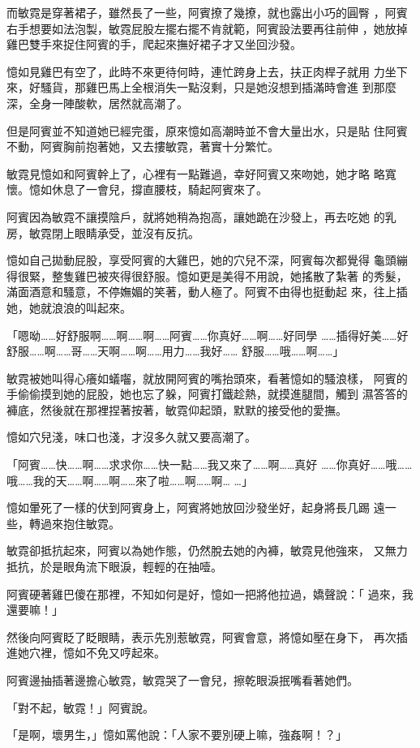 而敏霓是穿著裙子，雖然長了一些，阿賓撩了幾撩，就也露出小巧的圓臀
，阿賓右手想要如法泡製，敏霓屁股左擺右擺不肯就範，阿賓設法要再往前伸
，她放掉雞巴雙手來捉住阿賓的手，爬起來撫好裙子才又坐回沙發。

憶如見雞巴有空了，此時不來更待何時，連忙跨身上去，扶正肉桿子就用
力坐下來，好騷貨，那雞巴馬上全根消失一點沒剩，只是她沒想到插滿時會進
到那麼深，全身一陣酸軟，居然就高潮了。

但是阿賓並不知道她已經完蛋，原來憶如高潮時並不會大量出水，只是貼
住阿賓不動，阿賓胸前抱著她，又去摟敏霓，著實十分繁忙。

敏霓見憶如和阿賓幹上了，心裡有一點難過，幸好阿賓又來吻她，她才略
略寬懷。憶如休息了一會兒，撐直腰枝，騎起阿賓來了。

阿賓因為敏霓不讓摸陰戶，就將她稍為抱高，讓她跪在沙發上，再去吃她
的乳房，敏霓閉上眼睛承受，並沒有反抗。

憶如自己拋動屁股，享受阿賓的大雞巴，她的穴兒不深，阿賓每次都覺得
龜頭繃得很緊，整隻雞巴被夾得很舒服。憶如更是美得不用說，她搖散了紮著
的秀髮，滿面酒意和騷意，不停嫵媚的笑著，動人極了。阿賓不由得也挺動起
來，往上插她，她就浪浪的叫起來。

「嗯呦……好舒服啊……啊……啊……阿賓……你真好……啊……好同學
……插得好美……好舒服……啊……哥……天啊……啊……用力……我好……
舒服……哦……啊……」

敏霓被她叫得心癢如蟻囓，就放開阿賓的嘴抬頭來，看著憶如的騷浪樣，
阿賓的手偷偷摸到她的屁股，她也忘了躲，阿賓打鐵趁熱，就摸進腿間，觸到
濕答答的褲底，然後就在那裡捏著按著，敏霓仰起頭，默默的接受他的愛撫。

憶如穴兒淺，味口也淺，才沒多久就又要高潮了。

「阿賓……快……啊……求求你……快一點……我又來了……啊……真好
……你真好……哦……哦……我的天……啊……啊……來了啦……啊……啊…
…」

憶如暈死了一樣的伏到阿賓身上，阿賓將她放回沙發坐好，起身將長几踢
遠一些，轉過來抱住敏霓。

敏霓卻抵抗起來，阿賓以為她作態，仍然脫去她的內褲，敏霓見他強來，
又無力抵抗，於是眼角流下眼淚，輕輕的在抽噎。

阿賓硬著雞巴傻在那裡，不知如何是好，憶如一把將他拉過，嬌聲說：「
過來，我還要嘛！」

然後向阿賓眨了眨眼睛，表示先別惹敏霓，阿賓會意，將憶如壓在身下，
再次插進她穴裡，憶如不免又哼起來。

阿賓邊抽插著邊擔心敏霓，敏霓哭了一會兒，擦乾眼淚抿嘴看著她們。

「對不起，敏霓！」阿賓說。

「是啊，壞男生，」憶如罵他說：「人家不要別硬上嘛，強姦啊！？」

